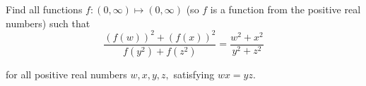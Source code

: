 Find all functions $ f: (0, \infty) \mapsto (0, \infty)$ (so $ f$ is a function from the positive real numbers) such that\[ \frac {\left( f(w) \right)^2 + \left( f(x) \right)^2}{f(y^2) + f(z^2) } = \frac {w^2 + x^2}{y^2 + z^2}
\]

for all positive real numbers $ w,x,y,z,$ satisfying $ wx = yz.$
